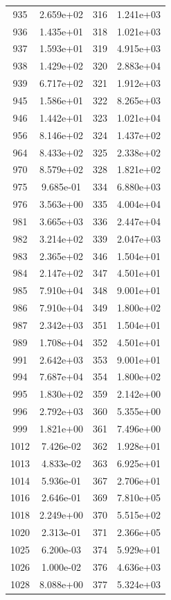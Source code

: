 \documentclass[12pt]{article}
\begin{document}
\begin{longtable}{@{}cccc@{}}
935 & 2.659e+02 & 316 & 1.241e+03 \\
936 & 1.435e+01 & 318 & 1.021e+03 \\
937 & 1.593e+01 & 319 & 4.915e+03 \\
938 & 1.429e+02 & 320 & 2.883e+04 \\
939 & 6.717e+02 & 321 & 1.912e+03 \\
945 & 1.586e+01 & 322 & 8.265e+03 \\
946 & 1.442e+01 & 323 & 1.021e+04 \\
956 & 8.146e+02 & 324 & 1.437e+02 \\
964 & 8.433e+02 & 325 & 2.338e+02 \\
970 & 8.579e+02 & 328 & 1.821e+02 \\
975 & 9.685e-01 & 334 & 6.880e+03 \\
976 & 3.563e+00 & 335 & 4.004e+04 \\
981 & 3.665e+03 & 336 & 2.447e+04 \\
982 & 3.214e+02 & 339 & 2.047e+03 \\
983 & 2.365e+02 & 346 & 1.504e+01 \\
984 & 2.147e+02 & 347 & 4.501e+01 \\
985 & 7.910e+04 & 348 & 9.001e+01 \\
986 & 7.910e+04 & 349 & 1.800e+02 \\
987 & 2.342e+03 & 351 & 1.504e+01 \\
989 & 1.708e+04 & 352 & 4.501e+01 \\
991 & 2.642e+03 & 353 & 9.001e+01 \\
994 & 7.687e+04 & 354 & 1.800e+02 \\
995 & 1.830e+02 & 359 & 2.142e+00 \\
996 & 2.792e+03 & 360 & 5.355e+00 \\
999 & 1.821e+00 & 361 & 7.496e+00 \\
1012 & 7.426e-02 & 362 & 1.928e+01 \\
1013 & 4.833e-02 & 363 & 6.925e+01 \\
1014 & 5.936e-01 & 367 & 2.706e+01 \\
1016 & 2.646e-01 & 369 & 7.810e+05 \\
1018 & 2.249e+00 & 370 & 5.515e+02 \\
1020 & 2.313e-01 & 371 & 2.366e+05 \\
1025 & 6.200e-03 & 374 & 5.929e+01 \\
1026 & 1.000e-02 & 376 & 4.636e+03 \\
1028 & 8.088e+00 & 377 & 5.324e+03 \\

\end{longtable}
\end{document}

